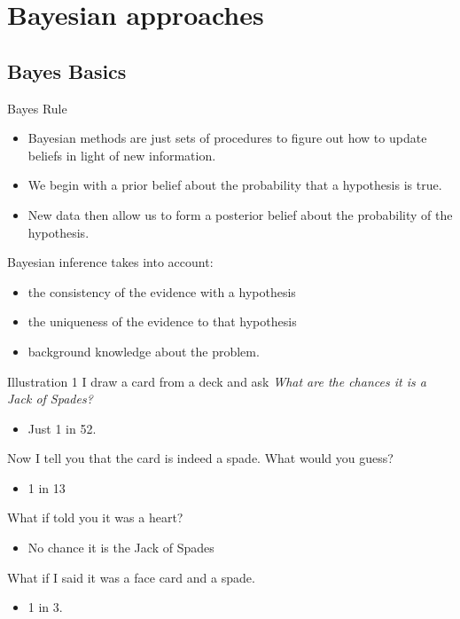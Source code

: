 \documentclass[
  11pt,
  ignorenonframetext,
]{beamer}
\providecommand{\tightlist}{%
  \setlength{\itemsep}{0pt}\setlength{\parskip}{0pt}}\usepackage{longtable,booktabs,array}
\begin{document}
\hypertarget{bayesian-approaches}{%
\section{Bayesian approaches}\label{bayesian-approaches}}

\hypertarget{bayes-basics}{%
\subsection{Bayes Basics}\label{bayes-basics}}

\begin{frame}{Bayes Rule}
\protect\hypertarget{bayes-rule}{}
\begin{itemize}
\item
  Bayesian methods are just sets of procedures to figure out how to
  update beliefs in light of new information.
\item
  We begin with a prior belief about the probability that a hypothesis
  is true.
\item
  New data then allow us to form a posterior belief about the
  probability of the hypothesis.
\end{itemize}

Bayesian inference takes into account:

\begin{itemize}
\tightlist
\item
  the consistency of the evidence with a hypothesis
\item
  the uniqueness of the evidence to that hypothesis
\item
  background knowledge about the problem.
\end{itemize}
\end{frame}

\begin{frame}{Illustration 1}
\protect\hypertarget{illustration-1-1}{}
I draw a card from a deck and ask \emph{What are the chances it is a
Jack of Spades?}

\begin{itemize}
\tightlist
\item
  Just 1 in 52.
\end{itemize}

Now I tell you that the card is indeed a spade. What would you guess?

\begin{itemize}
\tightlist
\item
  1 in 13
\end{itemize}

What if told you it was a heart?

\begin{itemize}
\tightlist
\item
  No chance it is the Jack of Spades
\end{itemize}

What if I said it was a face card and a spade.

\begin{itemize}
\tightlist
\item
  1 in 3.
\end{itemize}
\end{frame}
\end{document}
